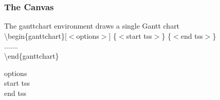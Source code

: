 \documentclass[ aspectratio=169,  12pt,blue,xcolor=pdftex,dvipsnames,table,handout,notes]{beamer}
\begin{document}
		\begin{frame}[t]
		\frametitle{The Canvas}

			The ganttchart environment draws a single Gantt chart\\

			\textbackslash begin\{ganttchart\}[\(<\)options\(>\)]
										\{\(<\)start tss\(>\)\}
										\{\(<\)end tss\(>\)\}\\
			.......\\
			\textbackslash end\{ganttchart\}


		\begin{description}
		\item[options]
		\item[start tss]
		\item[end tss]
		\end{description}

		\end{frame}
\end{document}
